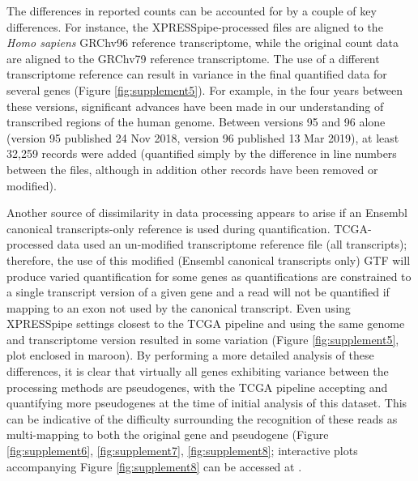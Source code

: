 \documentclass[10pt, oneside]{article}
\begin{document}
The differences in reported counts can be accounted for by a couple of key differences. For instance, the XPRESSpipe-processed files are aligned to the \textit{Homo sapiens} GRChv96 reference transcriptome, while the original count data are aligned to the GRChv79 reference transcriptome. The use of a different transcriptome reference can result in variance in the final quantified data for several genes (Figure \ref{fig:supplement5}). For example, in the four years between these versions, significant advances have been made in our understanding of transcribed regions of the human genome. Between versions 95 and 96 alone (version 95 published 24 Nov 2018, version 96 published 13 Mar 2019), at least 32,259 records were added (quantified simply by the difference in line numbers between the files, although in addition other records have been removed or modified). \par

Another source of dissimilarity in data processing appears to arise if an Ensembl canonical transcripts-only reference is used during quantification. TCGA-processed data used an un-modified transcriptome reference file (all transcripts); therefore, the use of this modified (Ensembl canonical transcripts only) GTF will produce varied quantification for some genes as quantifications are constrained to a single transcript version of a given gene and a read will not be quantified if mapping to an exon not used by the canonical transcript. Even using XPRESSpipe settings closest to the TCGA pipeline and using the same genome and transcriptome version resulted in some variation (Figure \ref{fig:supplement5}, plot enclosed in maroon). By performing a more detailed analysis of these differences, it is clear that virtually all genes exhibiting variance between the processing methods are pseudogenes, with the TCGA pipeline accepting and quantifying more pseudogenes at the time of initial analysis of this dataset. This can be indicative of the difficulty surrounding the recognition of these reads as multi-mapping to both the original gene and pseudogene (Figure \ref{fig:supplement6}, \ref{fig:supplement7}, \ref{fig:supplement8}; interactive plots accompanying Figure \ref{fig:supplement8} can be accessed at \cite{manuscript}. \par
\end{document}
